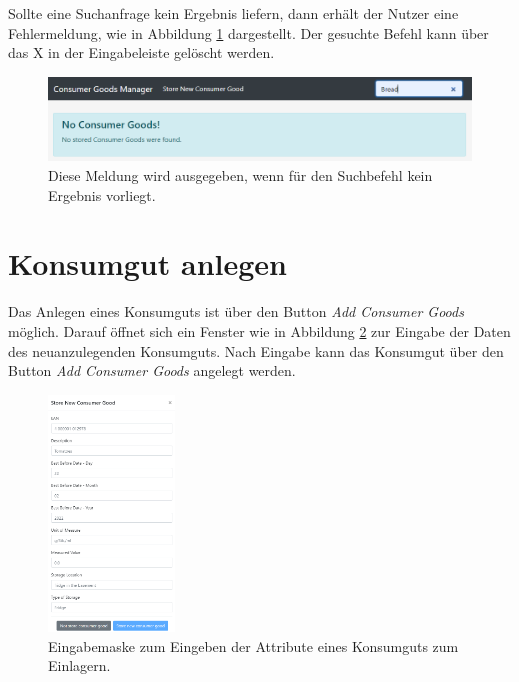 Sollte eine Suchanfrage kein Ergebnis liefern, dann erhält der Nutzer eine Fehlermeldung, wie in Abbildung \ref{fig:gui-search-not-found} dargestellt.
Der gesuchte Befehl kann über das X in der Eingabeleiste gelöscht werden.

\begin{figure}[H]
	\centering
	\includegraphics[width=1.0\textwidth]{Bilder/gui/new/gui-search-not-found.PNG}
	\caption[Rückmeldung bei keinem Ergebnis auf Suchanfrage.]{Diese Meldung wird ausgegeben, wenn für den Suchbefehl kein Ergebnis vorliegt.}
	\label{fig:gui-search-not-found}
\end{figure}

\section{Konsumgut anlegen}
\label{konsumgut-anlegen}
Das Anlegen eines Konsumguts ist über den Button \textit{Add Consumer Goods} möglich.
Darauf öffnet sich ein Fenster wie in Abbildung \ref{fig:gui-add-consumer} zur Eingabe der Daten des neuanzulegenden Konsumguts.
Nach Eingabe kann das Konsumgut über den Button \textit{Add Consumer Goods} angelegt werden.

\begin{figure}[H]
	\centering
	\includegraphics[width=0.3\textwidth]{Bilder/gui/new/gui-store-consumer-goods.PNG}
	\caption[Einlagern eines Konsumguts.]{Eingabemaske zum Eingeben der Attribute eines Konsumguts zum Einlagern.}
	\label{fig:gui-add-consumer}
\end{figure}

